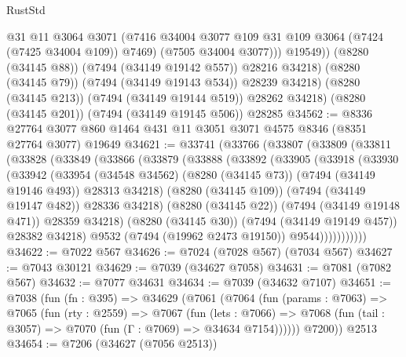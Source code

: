 \begin{lexlean}{RustStd}
\begin{coremodule}
                  @31
                  @11
                  @3064
                  @3071
                  (@7416 @34004 @3077 @109 @31 @109 @3064 (@7424 (@7425 @34004 @109)) @7469)
                  (@7505 @34004 @3077)))
              @19549))
          (@8280 (@34145 @88))
          (@7494 (@34149 @19142 @557))
          @28216
          @34218)
        (@8280 (@34145 @79))
        (@7494 (@34149 @19143 @534))
        @28239
        @34218)
      (@8280 (@34145 @213))
      (@7494 (@34149 @19144 @519))
      @28262
      @34218)
    (@8280 (@34145 @201))
    (@7494 (@34149 @19145 @506))
    @28285
@34562 := @8336 @27764 @3077 @860 @1464 @431 @11 @3051 @3071 @4575 @8346 (@8351 @27764 @3077) @19649
@34621 := @33741
    (@33766
      (@33807
        (@33809
          (@33811
            (@33828
              (@33849
                (@33866
                  (@33879
                    (@33888
                      (@33892
                        (@33905
                          (@33918
                            (@33930
                              (@33942
                                (@33954
                                  (@34548 @34562)
                                  (@8280 (@34145 @73))
                                  (@7494 (@34149 @19146 @493))
                                  @28313
                                  @34218)
                                (@8280 (@34145 @109))
                                (@7494 (@34149 @19147 @482))
                                @28336
                                @34218)
                              (@8280 (@34145 @22))
                              (@7494 (@34149 @19148 @471))
                              @28359
                              @34218)
                            (@8280 (@34145 @30))
                            (@7494 (@34149 @19149 @457))
                            @28382
                            @34218)
                          @9532
                          (@7494 (@19962 @2473 @19150))
                          @9544)))))))))))
@34622 := @7022 @567
@34626 := @7024 (@7028 @567) (@7034 @567)
@34627 := @7043 @30121
@34629 := @7039 (@34627 @7058)
@34631 := @7081 (@7082 @567)
@34632 := @7077 @34631
@34634 := @7039 (@34632 @7107)
@34651 := @7038
    (fun (fn : @395) =>
    @34629
      (@7061
        (@7064
          (fun (params : @7063) =>
          @7065
            (fun (rty : @2559) =>
            @7067
              (fun (lets : @7066) =>
              @7068 (fun (tail : @3057) => @7070 (fun (Γ : @7069) => @34634 @7154))))))
        @7200))
    @2513
@34654 := @7206 (@34627 (@7056 @2513))

\end{coremodule}
\end{lexlean}
